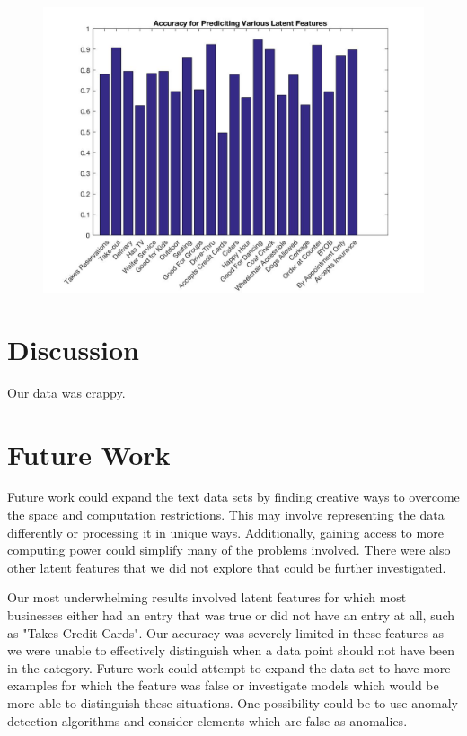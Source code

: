 \documentclass{article}
\begin{document}
\begin{figure}[h]
\includegraphics[scale = .4]{../fpAccuracy}


\end{figure}

\section{Discussion}

Our data was crappy.

\section{Future Work}

Future work could expand the text data sets by finding creative ways to overcome the space and computation restrictions.  This may involve representing the data differently or processing it in unique ways.  Additionally, gaining access to more computing power could simplify many of the problems involved.  There were also other latent features that we did not explore that could be further investigated.

Our most underwhelming results involved latent features for which most businesses either had an entry that was true or did not have an entry at all, such as "Takes Credit Cards".  Our accuracy was severely limited in these features as we were unable to effectively distinguish when a data point should not have been in the category.  Future work could attempt to expand the data set to have more examples for which the feature was false or investigate models which would be more able to distinguish these situations.  One possibility could be to use anomaly detection algorithms and consider elements which are false as anomalies.
\end{document}
